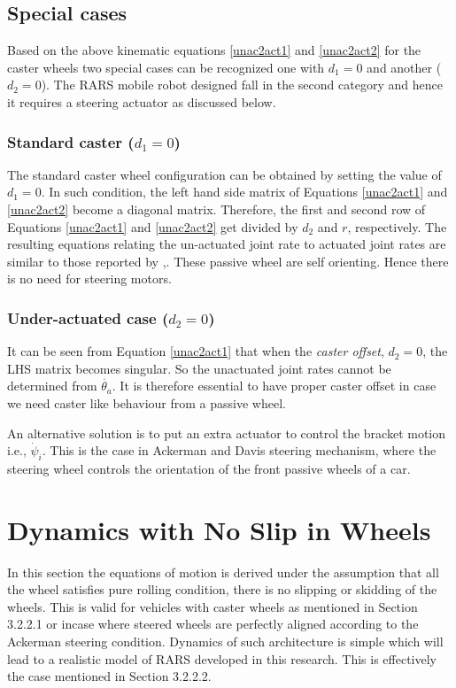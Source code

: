 \subsection{Special cases}
Based on the above kinematic equations \ref{unac2act1} and \ref{unac2act2} for the caster wheels two special cases can be recognized one with $d_1=0$ and another ($d_2=0$). The RARS mobile robot designed fall in the second category and hence it requires a steering actuator as discussed below.  
\subsubsection{Standard caster ($d_1=0$) }
The  standard caster wheel configuration can be obtained by setting the value of $d_1=0$. In such condition, the left hand side matrix of  Equations \ref{unac2act1} and \ref{unac2act2} become  a diagonal matrix. Therefore, the first and second row of Equations \ref{unac2act1} and \ref{unac2act2} get divided by $d_2$ and $r$, respectively. The resulting  equations relating the un-actuated joint rate to  actuated joint rates are similar to those reported by \cite{saha1991dynamics},\cite{angeles2013fundamentals}. These passive wheel are self orienting. Hence there is no need for steering motors. 
\subsubsection{Under-actuated case ($d_2=0$)}
It can be seen from Equation \ref{unac2act1} that when the \textit{caster offset}, $d_2=0$, the LHS matrix becomes singular. So the unactuated joint rates cannot be determined from $\dot{\theta_a}$. It is therefore essential to have proper caster offset in case we need caster like behaviour from a passive wheel. 

An alternative solution is to put an extra actuator to control the bracket motion i.e., $\dot\psi_i$. This is the case in Ackerman and Davis steering mechanism, where the steering wheel controls the orientation of the front passive wheels of a car.
\section{Dynamics with No Slip in Wheels }
In this section the equations of motion is derived under the assumption that all the wheel satisfies pure rolling condition, there is no slipping or skidding of the wheels. This is valid for vehicles with caster wheels as mentioned in Section 3.2.2.1 or incase where steered wheels are perfectly aligned according to the Ackerman steering condition. Dynamics of such architecture is simple which will lead to a realistic model of RARS developed in this research. This is effectively the case mentioned in Section 3.2.2.2. 


